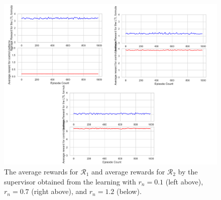 \begin{figure}[H] %
   \centering
   \vspace{2mm}
   \includegraphics[width = 12cm]{simulate_TD_v_15000_5000_rn_all_rsink_1000.png}
   \caption{The average rewards for $\mathcal{R}_1$ and average rewards for $\mathcal{R}_2$ by the supervisor obtained from the learning with $r_{n} = 0.1$ (left above), $r_n = 0.7$ (right above), and $r_n = 1.2$ (below).}
   \label{sim1}
\end{figure}
